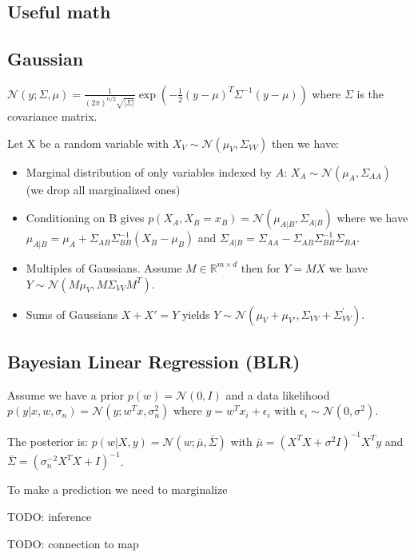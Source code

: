 \documentclass[11pt]{article}
\newcommand{\gauss}{\mathcal{N}}
\begin{document}
	
	\begin{multicols*}{3}
	
	\section*{Useful math}
	\subsection*{Gaussian}
	$\gauss(y;\Sigma,\mu) = \frac{1}{(2\pi)^{n/2} \sqrt{|\Sigma|}} \exp \left( - \frac{1}{2} (y-\mu)^T \Sigma^{-1}(y-\mu) \right) $ where $\Sigma$ is the covariance matrix.
	
	Let X be a random variable with $X_V \sim \gauss(\mu_V,\Sigma_{VV})$ then we have:
	\begin{itemize}
		\item Marginal distribution of only variables indexed by $A$: $X_A \sim \gauss(\mu_A,\Sigma_{AA})$ (we drop all marginalized ones)
		\item Conditioning on B gives $p(X_A,X_B = x_B) = \gauss(\mu_{A|B},\Sigma_{A|B})$ where we have $\mu_{A|B} = \mu_A + \Sigma_{AB}\Sigma_{BB}^{-1}(X_B - \mu_B)$ and $\Sigma_{A|B} = \Sigma_{AA} - \Sigma_{AB}\Sigma_{BB}^{-1}\Sigma_{BA}$.
		\item Multiples of Gaussians. Assume $M\in \mathbb{R}^{m\times d}$ then for $Y=MX$ we have $Y\sim \gauss (M\mu_V,M\Sigma_{VV}M^T)$.
		\item Sums of Gaussians $X+X'=Y$ yields $Y\sim \gauss (\mu_V + \mu_{V'} ,\Sigma_{VV} + \Sigma^{'}_{VV})$.
	\end{itemize}


	\subsection*{Bayesian Linear Regression (BLR)}
	Assume we have a prior $p(w) = \gauss (0,I)$ and a data likelihood $p(y|x,w,\sigma_n) = \gauss (y;w^Tx,\sigma^2_{n})$ where $y = w^Tx_i + \epsilon_i$ with $\epsilon_i \sim \gauss(0,\sigma^2)$.
	
	The posterior is: $p(w|X,y) = \gauss(w;\bar{\mu},\bar{\Sigma})$ with $\bar{\mu} = (X^TX + \sigma^2 I )^{-1}X^Ty$ and $\bar{\Sigma} = (\sigma_n^{-2}X^T X + I)^{-1}$.
	
	To make a prediction we need to marginalize 
	
	TODO: inference
	
	TODO: connection to map
	
	
	


\end{multicols*}
\end{document}
